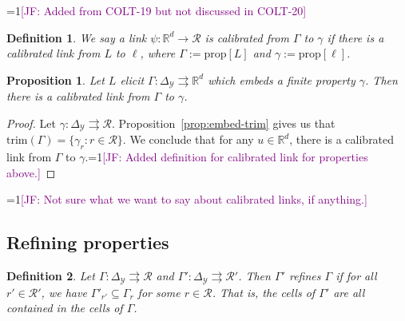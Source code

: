 \documentclass[12pt]{article}
\newcommand{\Comments}{1}
\newcommand{\mynote}[2]{\ifnum\Comments=1\textcolor{#1}{#2}\fi}
\newcommand{\jessie}[1]{\mynote{purple}{[JF: #1]}}
\newcommand{\reals}{\mathbb{R}}
\newcommand{\prop}[1]{\mathrm{prop}[#1]}
\newcommand{\simplex}{\Delta_\Y}
\newcommand{\R}{\mathcal{R}}
\newcommand{\Y}{\mathcal{Y}}
\newcommand{\toto}{\rightrightarrows}
\newcommand{\trim}{\mathrm{trim}}
\newtheorem{proposition}{Proposition}
\newtheorem{definition}{Definition}
\begin{document}
\jessie{Added from COLT-19 but not discussed in COLT-20}

\begin{definition}
	We say a link $\psi:\reals^d \to \R$ is \emph{calibrated from $\Gamma$ to $\gamma$} if there is a calibrated link from $L$ to $\ell$, where $\Gamma := \prop{L}$ and $\gamma:= \prop{\ell}$.
\end{definition}

\begin{proposition}
	Let $L$ elicit $\Gamma:\simplex \toto \reals^d$ which embeds a finite property $\gamma$.
	Then there is a calibrated link from $\Gamma$ to $\gamma$.
\end{proposition}
\begin{proof}
	Let $\gamma: \simplex \toto \R$.
	Proposition~\ref{prop:embed-trim} gives us that $\trim(\Gamma) = \{\gamma_r : r \in \R\}$.
	We conclude that for any $u \in \reals^d$, there is a calibrated link from $\Gamma$ to $\gamma$.\jessie{Added definition for calibrated link for properties above.}
\end{proof}
\jessie{Not sure what we want to say about calibrated links, if anything.}

\subsection{Refining properties}

\begin{definition}
	Let $\Gamma:\simplex \toto \R$ and $\Gamma':\simplex\toto \R'$.
	Then $\Gamma'$ \emph{refines} $\Gamma$ if for all $r' \in \R'$, we have $\Gamma'_{r'} \subseteq \Gamma_r$ for some $r \in \R$.
	That is, the cells of $\Gamma'$ are all contained in the cells of $\Gamma$.
\end{definition}
\end{document}
